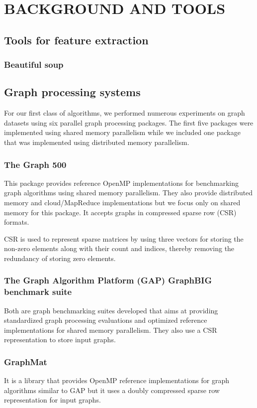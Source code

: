\chapter{BACKGROUND AND TOOLS } 
\section{Tools for feature extraction}
\subsection{Beautiful soup}
\section{Graph processing systems}
For our first class of algorithms, we performed numerous experiments on graph datasets using six parallel graph processing packages. The first five packages were implemented using shared memory parallelism while we included one package that was implemented using distributed memory parallelism.

\subsection{The Graph 500}
This package provides reference OpenMP implementations for benchmarking graph algorithms using shared memory parallelism. They also provide distributed memory  and cloud/MapReduce implementations but we focus only on shared memory for this package. It accepts graphs in compressed sparse row (CSR) formats. 

CSR is used to represent sparse matrices by using three vectors for storing the non-zero elements along with their count and indices, thereby removing the redundancy of storing zero elements.


\subsection{The Graph Algorithm Platform (GAP) GraphBIG benchmark suite}
Both are graph benchmarking suites developed that aims at providing standardized graph processing evaluations and optimized reference implementations for shared memory parallelism. They also use a CSR representation to store input graphs.

\subsection{GraphMat}
It is a library that provides OpenMP reference implementations for graph algorithms similar to GAP but it uses a doubly compressed sparse row representation for input graphs.

